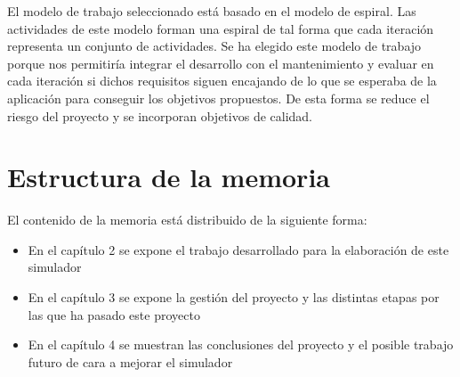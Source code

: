 El modelo de trabajo seleccionado está basado en el modelo de espiral. Las actividades de este modelo forman una espiral de tal forma que cada iteración representa un conjunto de actividades. Se ha elegido este modelo de trabajo porque nos permitiría integrar el desarrollo con el mantenimiento y evaluar en cada iteración si dichos requisitos siguen encajando de lo que se esperaba de la aplicación para conseguir los objetivos propuestos. De esta forma se reduce el riesgo del proyecto y se incorporan objetivos de calidad.

\section{Estructura de la memoria}

El contenido de la memoria está distribuido de la siguiente forma:

\begin{itemize}
       \item En el capítulo 2 se expone el trabajo desarrollado para la elaboración de este simulador
       \item En el capítulo 3 se expone la gestión del proyecto y las distintas etapas por las que ha pasado este proyecto
       \item En el capítulo 4 se muestran las conclusiones del proyecto y el posible trabajo futuro de cara a mejorar el simulador 
\end{itemize}